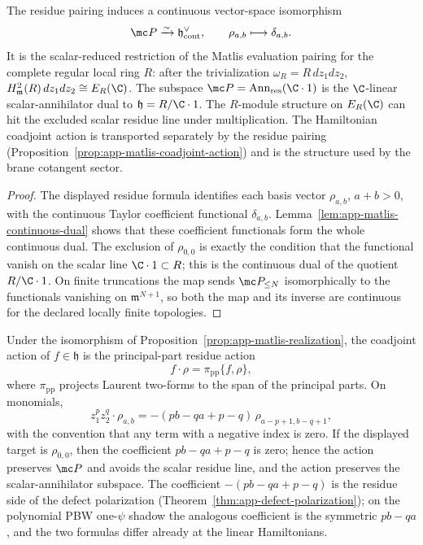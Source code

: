 \begin{prop}
\label{prop:app-matlis-realization}
  The residue pairing induces a continuous vector-space isomorphism
  \[
    \mc P\xrightarrow{\sim}\mathfrak h^\vee_{\mathrm{cont}},
    \qquad
    \rho_{a,b}\longmapsto\delta_{a,b}.
  \]
  It is the scalar-reduced restriction of the Matlis evaluation
  pairing for the complete regular local ring \(R\): after the
  trivialization \(\omega_R=R\,dz_1dz_2\),
  \(H^2_{\mathfrak m}(R)\,dz_1dz_2\cong E_R(\C)\).  The subspace
  \(\mc P=\operatorname{Ann}_{\mathrm{res}}(\C\cdot1)\) is the
  \(\C\)-linear scalar-annihilator dual to
  \(\mathfrak h=R/\C\cdot1\).  The \(R\)-module structure on
  \(E_R(\C)\) can hit the excluded scalar residue line under
  multiplication.  The Hamiltonian coadjoint action is
  transported separately by the residue pairing
  (Proposition~\ref{prop:app-matlis-coadjoint-action}) and is the
  structure used by the brane cotangent sector.
\end{prop}

\begin{proof}
  The displayed residue formula identifies each basis vector
  \(\rho_{a,b}\), \(a+b>0\), with the continuous Taylor coefficient
  functional \(\delta_{a,b}\).  Lemma~\ref{lem:app-matlis-continuous-dual}
  shows that these coefficient functionals form the whole continuous
  dual.  The exclusion of \(\rho_{0,0}\) is exactly the condition that
  the functional vanish on the scalar line \(\C\cdot1\subset R\); this is
  the continuous dual of the quotient \(R/\C\cdot1\).  On finite truncations
  the map sends \(\mc P_{\leq N}\) isomorphically to the functionals
  vanishing on \(\mathfrak m^{N+1}\), so both the map and its inverse are
  continuous for the declared locally finite topologies.
\end{proof}

\begin{prop}
\label{prop:app-matlis-coadjoint-action}
  Under the isomorphism of
  Proposition~\ref{prop:app-matlis-realization}, the coadjoint action
  of \(f\in\mathfrak h\) is the principal-part residue action
  \[
    f\cdot\rho=\pi_{\mathrm{pp}}\{f,\rho\},
  \]
  where \(\pi_{\mathrm{pp}}\) projects Laurent two-forms to the span
  of the principal parts.  On monomials,
  \begin{equation}
  \label{eq:app-matlis-coadjoint-monomial}
    z_1^p z_2^q\cdot\rho_{a,b}
      =-(pb-qa+p-q)\,\rho_{a-p+1,b-q+1},
  \end{equation}
  with the convention that any term with a negative index is zero.  If the
  displayed target is \(\rho_{0,0}\), then the coefficient \(pb-qa+p-q\)
  is zero; hence the action preserves \(\mc P\) and avoids the scalar
  residue line,
  and the action preserves the scalar-annihilator subspace.  The
  coefficient \(-(pb-qa+p-q)\) is the residue side of the defect
  polarization (Theorem~\ref{thm:app-defect-polarization}); on the
  polynomial PBW one-\(\psi\) shadow the analogous coefficient is the
  symmetric \(pb-qa\), and the two formulas differ already at the linear
  Hamiltonians.
\end{prop}

